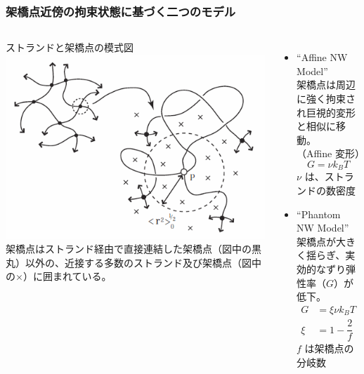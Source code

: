 \documentclass[11pt, dvipdfmx]{beamer}
\begin{document}
    \begin{frame}
        \frametitle{架橋点近傍の拘束状態に基づく二つのモデル}
        \begin{columns}[totalwidth=1\textwidth]
        ストランドと架橋点の模式図
        \includegraphics[width=\textwidth]{./fig/JP_vicinity.png}
        架橋点はストランド経由で直接連結した架橋点（図中の黒丸）以外の、近接する多数のストランド及び架橋点（図中の×）に囲まれている。
        \begin{itemize}
        \item
        ``Affine NW Model''\\
        架橋点は周辺に強く拘束され巨視的変形と相似に移動。\\（Affine 変形）
        \footnotesize
        \begin{equation*}
        G=\nu k_B T
        \end{equation*}
        \normalsize
        $\nu$ は、ストランドの数密度
        \item
        ``Phantom NW Model''\\
        架橋点が大きく揺らぎ、実効的なずり弾性率（$G$）が低下。
        \footnotesize
        \begin{align*}
        G&=\xi \nu k_B T \\
        \xi&= 1 -\dfrac{2}{f}
        \end{align*}
        \normalsize
        $f$ は架橋点の分岐数
        \end{itemize}
        \end{columns}
        \end{frame}
\end{document}

